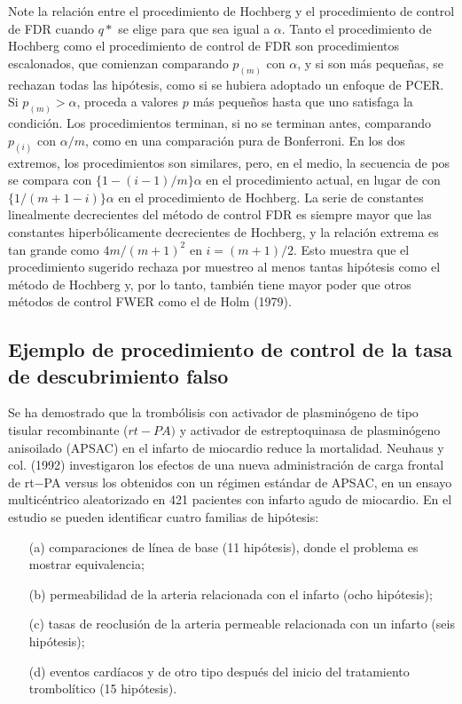 \documentclass[11pt,letterpaper]{article}
\begin{document}
Note la relación entre el procedimiento de Hochberg y el procedimiento de control de FDR cuando $q *$ se elige para que sea igual a $\alpha$. Tanto el procedimiento de Hochberg como el procedimiento de control de FDR son procedimientos escalonados, que comienzan comparando $p_{(m)}$ con $\alpha$, y si son más pequeñas, se rechazan todas las hipótesis, como si se hubiera adoptado un enfoque de PCER. Si $p_{(m)}> \alpha$, proceda a valores $p$ más pequeños hasta que uno satisfaga la condición. Los procedimientos terminan, si no se terminan antes, comparando $p_{(i)}$ con $\alpha/m$, como en una comparación pura de Bonferroni. En los dos extremos, los procedimientos son similares, pero, en el medio, la secuencia de pos se compara con $\{1 - (i - 1) / m\}\alpha$ en el procedimiento actual, en lugar de con $\{1 /(m + 1 - i) \}\alpha$ en el procedimiento de Hochberg. La serie de constantes linealmente decrecientes del método de control FDR es siempre mayor que las constantes hiperbólicamente decrecientes de Hochberg, y la relación extrema es tan grande como $4m/(m + 1)^2$ en $i = (m + 1) / 2$. Esto muestra que el procedimiento sugerido rechaza por muestreo al menos tantas hipótesis como el método de Hochberg y, por lo tanto, también tiene mayor poder que otros métodos de control FWER como el de Holm (1979).

\subsection{Ejemplo de procedimiento de control de la tasa de descubrimiento falso}

Se ha demostrado que la trombólisis con activador de plasminógeno de tipo tisular recombinante ($rt-PA)$ y activador de estreptoquinasa de plasminógeno anisoilado (APSAC) en el infarto de miocardio reduce la mortalidad. Neuhaus y col. (1992) investigaron los efectos de una nueva administración de carga frontal de rt$-$PA versus los obtenidos con un régimen estándar de APSAC, en un ensayo multicéntrico aleatorizado en 421 pacientes con infarto agudo de miocardio. En el estudio se pueden identificar cuatro familias de hipótesis:
\begin{itemize}
\item[(a)] comparaciones de línea de base (11 hipótesis), donde el problema es mostrar equivalencia; 
\item[(b)] permeabilidad de la arteria relacionada con el infarto (ocho hipótesis); 
\item[(c)] tasas de reoclusión de la arteria permeable relacionada con un infarto (seis hipótesis);
\item[(d)] eventos cardíacos y de otro tipo después del inicio del tratamiento trombolítico (15 hipótesis).
\end{itemize}
\end{document}
